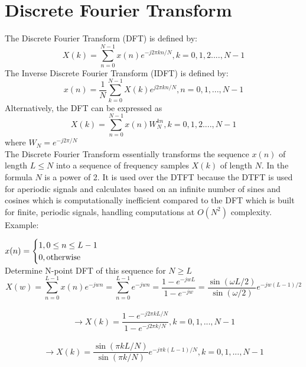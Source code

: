 \documentclass{article}
\begin{document}
\section{Discrete Fourier Transform}
The Discrete Fourier Transform (DFT) is defined by:
\begin{equation}
X(k) =\sum_{n=0}^{N-1}x(n)e^{-j2\pi k n/N}, k =0,1,2....,N-1
\end{equation}
The Inverse Discrete Fourier Transform (IDFT) is defined by:
\begin{equation}
x(n) = \frac{1}{N}\sum_{k=0}^{N-1}X(k)e^{j2\pi k n/N}, n = 0,1,...,N-1
\end{equation}
Alternatively, the DFT can be expressed as 
\begin{equation}
X(k) = \sum_{n=0}^{N-1}x(n)W_N^{kn}, k =0,1,2....,N-1
\end{equation}
where $W_N=e^{-j2\pi/N}$ \\
\vspace{1em}
The Discrete Fourier Transform essentially transforms the sequence $x(n)$ of length $L \leq N$ into a sequence of frequency samples $X(k)$ of length $N$. In the formula $N$ is a power of 2. It is used over the DTFT because the DTFT is used for aperiodic signals and calculates based on an infinite number of sines and cosines which is computationally inefficient compared to the DFT which is built for finite, periodic signals, handling computations at $O(N^2)$ complexity. \\
\vspace{1em}
Example:
\begin{center}
$x(n) = \begin{cases}
1, \space 0 \leq n \leq L -1 \\
0, \space \text{otherwise}
\end{cases}$ \\
\vspace{1em}
Determine N-point DFT of this sequence for $N \geq L$ \\
\vspace{1em}
$$X(w) = \sum_{n=0}^{L-1}x(n)e^{-jwn}=\sum_{n=0}^{L-1}e^{-jwn}= \frac{1-e^{-jwL}}{1-e^{-jw}}=\frac{\sin(\omega L/2)}{\sin(\omega/2)}e^{-jw(L-1)/2}$$ \\
$$\rightarrow X(k) = \frac{1-e^{-j2\pi kL/N}}{1-e^{-j2\pi k/N}}, k=0,1,...,N-1$$ \\
$$\rightarrow X(k) = \frac{\sin(\pi k L/N)}{\sin(\pi k/N)}e^{-j\pi k(L-1)/N}, k=0,1,...,N-1$$ 
\end{center}
\end{document}
